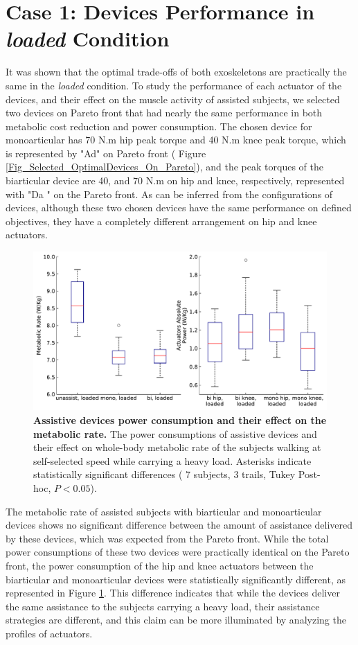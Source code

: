 \documentclass[10pt,letterpaper]{article}
\begin{document}
\section*{Case 1: Devices Performance in \textit{loaded} Condition}
It was shown that the optimal trade-offs of both exoskeletons are practically the same in the {\it loaded} condition. To study the performance of each actuator of the devices, and their effect on the muscle activity of assisted subjects, we selected two devices on Pareto front that had nearly the same performance in both metabolic cost reduction and power consumption. The chosen device for monoarticular has 70 N.m hip peak torque and 40 N.m knee peak torque, which is represented by "Ad" on Pareto front ( Figure \ref{Fig_Selected_OptimalDevices_On_Pareto}), and the peak torques of the biarticular device are 40, and 70 N.m on hip and knee, respectively, represented with "Da " on the Pareto front. As can be inferred from the configurations of devices, although these two chosen devices have the same performance on defined objectives, they have a completely different arrangement on hip and knee actuators.
\begin{figure}[ht]   
	\centering
	\includegraphics[width=\linewidth]{Case_Studies/LoadedMono04_LoadedBi16/PaperFigure_BoxPlot.pdf}
	\vspace{1mm}
	\caption{\small{\textbf{Assistive devices power consumption and their effect on the metabolic rate.} The power consumptions of assistive devices and their effect on whole-body metabolic rate of the subjects walking at self-selected speed while carrying a heavy load. Asterisks indicate statistically significant differences ( 7 subjects, 3 trails, Tukey Post-hoc, $P < 0.05$).}}
	\label{Fig_Case01_Energy_Plot}
\end{figure}
The metabolic rate of assisted subjects with biarticular and monoarticular devices shows no significant difference between the amount of assistance delivered by these devices, which was expected from the Pareto front. While the total power consumptions of these two devices were practically identical on the Pareto front, the power consumption of the hip and knee actuators between the biarticular and monoarticular devices were statistically significantly different, as represented in Figure \ref{Fig_Case01_Energy_Plot}. This difference indicates that while the devices deliver the same assistance to the subjects carrying a heavy load, their assistance strategies are different, and this claim can be more illuminated by analyzing the profiles of actuators.\\
\end{document}
